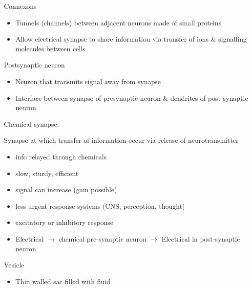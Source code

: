 \documentclass[11pt,fleqn]{book} %
\begin{document}
\begin{descriptions}
\begin{itemize}
\begin{itemize}
        \end{itemize}
    \end{itemize}
    \item[Connexons]
    \begin{descriptions}
    \end{descriptions}
    \begin{itemize}
        \item Tunnels (channels) between adjacent neurons made of small proteins
        \item Allow electrical synapse to share information via transfer of ions \& signalling molecules between cells
    \end{itemize}
    \item[Postsynaptic neuron]
    \begin{descriptions}
    \end{descriptions}
    \begin{itemize}
        \item Neuron that transmits signal away from synapse
        \item Interface between synapse of presynaptic neuron \& dendrites of post-synaptic neuron
    \end{itemize}
    \item[Chemical synapse:] 
    \begin{descriptions}
    \end{descriptions}    
    Synapse at which transfer of information occur via release of neurotransmitter
    \begin{itemize}
        \item info relayed through chemicals
        \item slow, sturdy, efficient
        \item signal can increase (gain possible)
        \item less urgent response systems (CNS, perception, thought)
        \item excitatory or inhibitory response
        \item Electrical $\rightarrow$ chemical pre-synaptic neuron $\rightarrow$ Electrical in post-synaptic neuron
    \end{itemize}
    \item[Vesicle]
    \begin{descriptions}
    \end{descriptions}
    \begin{itemize}
        \item Thin walled sac filled with fluid

\end{itemize}
\end{descriptions}
\end{document}
